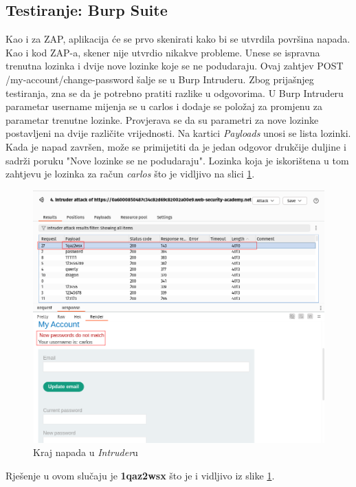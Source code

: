 \subsection{Testiranje: Burp Suite}
Kao i za ZAP, aplikacija će se prvo skenirati kako bi se utvrdila površina napada. 
Kao i kod ZAP-a, skener nije utvrdio nikakve probleme. 
Unese se ispravna trenutna lozinka i dvije nove lozinke koje se ne podudaraju. 
Ovaj zahtjev POST /my-account/change-password šalje se u Burp Intruderu. 
Zbog prijašnjeg testiranja, zna se da je potrebno pratiti razlike u odgovorima.
U Burp Intruderu parametar username mijenja se u carlos i dodaje se položaj za promjenu za parametar trenutne lozinke. 
Provjerava se da su parametri za nove lozinke postavljeni na dvije različite vrijednosti. 
Na kartici \textit{Payloads} unosi se lista lozinki.
Kada je napad završen, može se primijetiti da je jedan odgovor drukčije duljine i sadrži poruku "Nove lozinke se ne podudaraju". 
Lozinka koja je iskorištena u tom zahtjevu je lozinka za račun \textit{carlos} što je vidljivo na slici \ref{slk:atk_end}.

\begin{figure}[H]
  \centering
  \includegraphics[width=1\textwidth]{slike/butp_bf_fuzz.png}
  \caption{Kraj napada u \textit{Intruder}u}
  \label{slk:atk_end}
\end{figure}
Rješenje u ovom slučaju je \textbf{1qaz2wsx} što je i vidljivo iz slike \ref{slk:atk_end}.